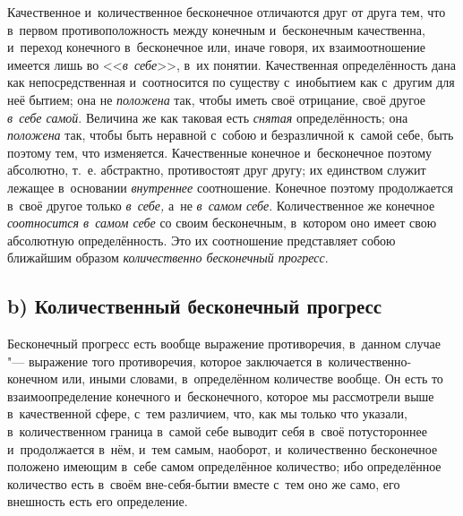 Качественное и~количественное бесконечное отличаются друг от друга тем, что
в~первом противоположность между конечным и~бесконечным качественна, и~переход
конечного в~бесконечное или, иначе говоря, их взаимоотношение имеется лишь во
<<{\em в~себе}>>, в~их понятии. Качественная определённость дана как
непосредственная и~соотносится по существу с~инобытием как с~другим для неё
бытием; она не {\em положена} так, чтобы иметь своё отрицание, своё другое
{\em в~себе самой}. Величина же как таковая есть {\em снятая}
определённость; она {\em положена} так, чтобы быть неравной с~собою и
безразличной к~самой себе, быть поэтому тем, что изменяется. Качественные
конечное и~бесконечное поэтому абсолютно, т.~е. абстрактно, противостоят друг
другу; их единством служит лежащее в~основании {\em внутреннее} соотношение.
Конечное поэтому продолжается в~своё другое только {\em в~себе,} а~не
{\em в~самом себе}. Количественное же конечное {\em соотносится в~самом себе}
со своим бесконечным, в~котором оно имеет свою абсолютную определённость. Это
их соотношение представляет собою ближайшим образом
{\em количественно бесконечный прогресс}.

\subsection[b) Количественный бесконечный прогресс]%
{b) Количественный бесконечный прогресс}

Бесконечный прогресс есть вообще выражение противоречия, в~данном случае "---
выражение того противоречия, которое заключается в~количественно-конечном или,
иными словами, в~определённом количестве вообще. Он есть то взаимоопределение
конечного и~бесконечного, которое мы рассмотрели выше в~качественной сфере,
с~тем различием, что, как мы только что указали, в~количественном граница
в~самой себе выводит себя в~своё потустороннее и~продолжается в~нём, и~тем
самым, наоборот, и~количественно бесконечное положено имеющим в~себе самом
определённое количество; ибо определённое количество есть в~своём
вне-себя-бытии вместе с~тем оно же само, его внешность есть его определение.

